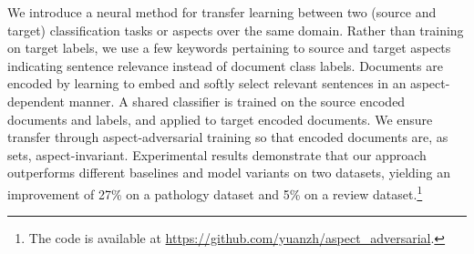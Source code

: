 
We introduce a neural method for transfer learning between two (source and target) classification tasks or aspects over the same domain. Rather than training on target labels, we use a few keywords pertaining to source and target aspects indicating sentence relevance instead of document class labels. Documents are encoded by learning to embed and softly select relevant sentences in an aspect-dependent manner. A shared classifier is trained on the source encoded documents and labels, and applied to target encoded documents. We ensure transfer through aspect-adversarial training so that encoded documents are, as sets, aspect-invariant.
Experimental results demonstrate that our approach outperforms different baselines and model variants on two datasets, yielding an improvement of 27\% on a pathology dataset and 5\% on a review dataset.\footnote{The code is available at \url{https://github.com/yuanzh/aspect_adversarial}.}
